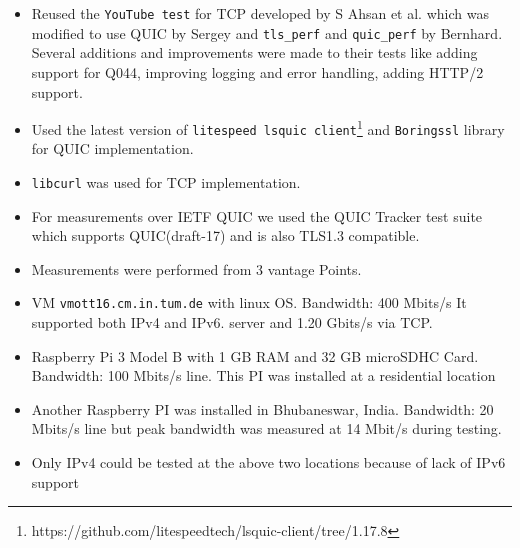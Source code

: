 \begin{frame}
\begin{itemize}
\itemsep3em 
\item Reused the \texttt{YouTube test} for TCP developed by S Ahsan et al.\cite{DBLP:conf/pam/AhsanBOS15} which was modified to use QUIC by Sergey\cite{sergey} and \texttt{tls\_perf} and \texttt{\texttt{quic\_perf}} by Bernhard\cite{bernhard}. Several additions and improvements were made to their tests like adding support for Q044, improving logging and error handling, adding HTTP/2 support.

\item Used the latest version of \texttt{litespeed lsquic client}\footnote[frame]{https://github.com/litespeedtech/lsquic-client/tree/1.17.8} and \texttt{Boringssl} library for QUIC implementation.

\item \texttt{libcurl} was used for TCP implementation.

\item For measurements over IETF QUIC we used the QUIC Tracker \cite{quic_tracker} test suite which supports QUIC(draft-17) and is also TLS1.3 compatible.

%
%
\end{itemize}
\end{frame}
\clearpage

\begin{frame}
\begin{itemize}
\itemsep3em
\item Measurements were performed from 3 vantage Points.  

\item VM \texttt{vmott16.cm.in.tum.de} with linux OS. Bandwidth: 400 Mbits/s
It supported both IPv4 and IPv6.
server and 1.20 Gbits/s via TCP. 

\item Raspberry Pi 3 Model B with 1 GB RAM and 32 GB microSDHC Card. Bandwidth: 100 Mbits/s line. This PI was installed at a residential location

\item Another Raspberry PI was installed in Bhubaneswar, India. Bandwidth: 20 Mbits/s line but peak bandwidth was measured at 14 Mbit/s during testing. 

\item Only IPv4 could be tested at the above two locations because of lack of IPv6 support

\end{itemize}
\end{frame}
\clearpage

